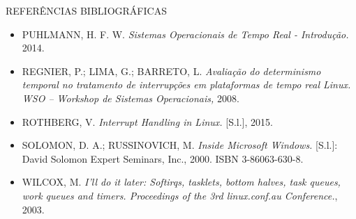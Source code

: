 \documentclass[12pt,brazil]{beamer}
\begin{document}
\begin{frame}{REFERÊNCIAS BIBLIOGRÁFICAS}

\begin{itemize}
    \item PUHLMANN, H. F. W. \textit{Sistemas Operacionais de Tempo Real - Introdução.} 2014.
    \item REGNIER, P.; LIMA, G.; BARRETO, L. \textit{Avaliação do determinismo temporal no tratamento de interrupções em plataformas de tempo real Linux. WSO – Workshop de Sistemas Operacionais,} 2008.
    \item ROTHBERG, V. \textit{Interrupt Handling in Linux.} [S.l.], 2015.
    \item SOLOMON, D. A.; RUSSINOVICH, M. \textit{Inside Microsoft Windows.} [S.l.]: David Solomon Expert Seminars, Inc., 2000. ISBN 3-86063-630-8.
    \item WILCOX, M. \textit{I’ll do it later: Softirqs, tasklets, bottom halves, task queues, work queues and timers. Proceedings of the 3rd linux.conf.au Conference.}, 2003.
\end{itemize}

\end{frame}
\end{document}

